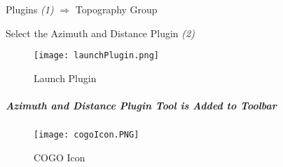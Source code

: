 \noindent Plugins \emph{(1)} $\Rightarrow$ Topography Group
\vspace{.1in}

\noindent Select the Azimuth and Distance Plugin \emph{(2)}
\begin{figure}[H] %
\centering
    \texttt{[image: launchPlugin.png]}
\vspace{-.3in}

\caption{Launch Plugin}
\end{figure}
\vspace{.1in}

\subparagraph*{Azimuth and Distance Plugin Tool is Added to Toolbar}
\begin{figure}[H]
\centering
     \texttt{[image: cogoIcon.PNG]}

\caption{COGO Icon}
\end{figure}


